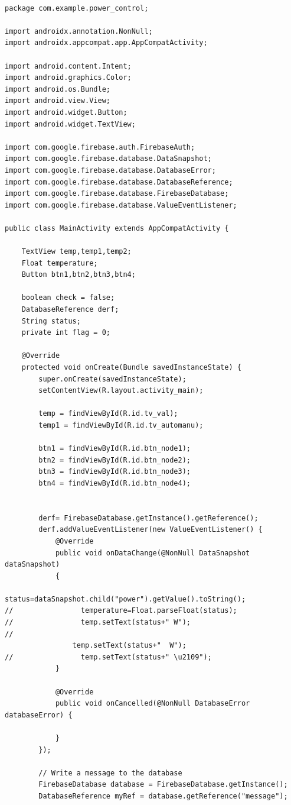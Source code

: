 \documentclass[12pt,a4paper]{article}
\begin{document}
\begin{lstlisting}[frame=single]

package com.example.power_control;

import androidx.annotation.NonNull;
import androidx.appcompat.app.AppCompatActivity;

import android.content.Intent;
import android.graphics.Color;
import android.os.Bundle;
import android.view.View;
import android.widget.Button;
import android.widget.TextView;

import com.google.firebase.auth.FirebaseAuth;
import com.google.firebase.database.DataSnapshot;
import com.google.firebase.database.DatabaseError;
import com.google.firebase.database.DatabaseReference;
import com.google.firebase.database.FirebaseDatabase;
import com.google.firebase.database.ValueEventListener;

public class MainActivity extends AppCompatActivity {

    TextView temp,temp1,temp2;
    Float temperature;
    Button btn1,btn2,btn3,btn4;

    boolean check = false;
    DatabaseReference derf;
    String status;
    private int flag = 0;

    @Override
    protected void onCreate(Bundle savedInstanceState) {
        super.onCreate(savedInstanceState);
        setContentView(R.layout.activity_main);

        temp = findViewById(R.id.tv_val);
        temp1 = findViewById(R.id.tv_automanu);

        btn1 = findViewById(R.id.btn_node1);
        btn2 = findViewById(R.id.btn_node2);
        btn3 = findViewById(R.id.btn_node3);
        btn4 = findViewById(R.id.btn_node4);


        derf= FirebaseDatabase.getInstance().getReference();
        derf.addValueEventListener(new ValueEventListener() {
            @Override
            public void onDataChange(@NonNull DataSnapshot dataSnapshot)
            {
                status=dataSnapshot.child("power").getValue().toString();
//                temperature=Float.parseFloat(status);
//                temp.setText(status+" W");
//
                temp.setText(status+"  W");
//                temp.setText(status+" \u2109");
            }

            @Override
            public void onCancelled(@NonNull DatabaseError databaseError) {

            }
        });

        // Write a message to the database
        FirebaseDatabase database = FirebaseDatabase.getInstance();
        DatabaseReference myRef = database.getReference("message");


\end{lstlisting}
\end{document}
